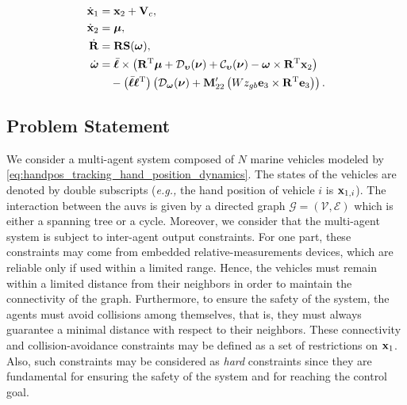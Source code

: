 \vspace*{-1.7em}

\begin{subequations}
    \begin{align}
        \dot{\mathbf{x}}_1 &= \mathbf{x}_2 + \mathbf{V}_c, \label{eq:handpos_tracking_x_1_dot_transformed}\\
        \dot{\mathbf{x}}_2 &= \bm{\mu}, \label{eq:handpos_tracking_x_2_dot_transformed}\\
        \dot{\mathbf{R}} &= \mathbf{R}\mathbf{S}(\bm{\omega}), \label{eq:handpos_tracking_R_dot_CL} \\
        \dot{\bm{\omega}} &= \Bar{\boldsymbol{\ell}} \times \left(\mathbf{R}^{\mathrm{T}}\bm{\mu} + \mathcal{D}_{\bm{\upsilon}}(\bm{\nu}) + \mathcal{C}_{\bm{\upsilon}}(\bm{\nu}) - \bm{\omega} \times \mathbf{R}^{\mathrm{T}} \mathbf{x}_2\right) \label{eq:handpos_tracking_omega_dot_CL} \\
            & \quad - \left(\Bar{\boldsymbol{\ell}}\boldsymbol{\ell}^{\mathrm{T}}\right) \left(\mathcal{D}_{\bm{\omega}}(\bm{\nu}) + \mathbf{M}_{22}^{\prime}\left(Wz_{gb} \mathbf{e}_3 \times \mathbf{R}^{\mathrm{T}} \mathbf{e}_3\right)\right). \nonumber
    \end{align} \label{eq:handpos_tracking_hand_position_dynamics}
\end{subequations}

\subsection{Problem Statement}

We consider a multi-agent system composed of $N$ marine vehicles modeled by \eqref{eq:handpos_tracking_hand_position_dynamics}.
The states of the vehicles are denoted by double subscripts (\emph{e.g.,} the hand position of vehicle $i$ is $\mathbf{x}_{1, i}$).
The interaction between the \glspl{auv} is given by a directed graph $\mathcal{G}=(\mathcal{V},\mathcal{E})$ which is either a spanning tree or a cycle.
Moreover, we consider that the multi-agent system is subject to inter-agent output constraints.
For one part, these constraints may come from embedded relative-measurements devices, which are reliable only if used within a limited range. Hence, the vehicles must remain within a limited distance from their neighbors in order to maintain the connectivity of the graph.
Furthermore, to ensure the safety of the system, the agents must avoid collisions among themselves, that is, they must always guarantee a minimal distance with respect to their neighbors.
These connectivity and collision-avoidance constraints may be defined as a set of restrictions on $\mathbf{x}_1$. Also, such constraints may be considered as \emph{hard} constraints since they are fundamental for ensuring the safety of the system and for reaching the control goal.

